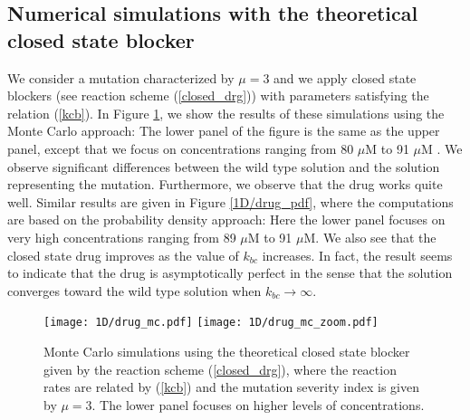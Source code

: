 \subsection{Numerical simulations with the theoretical closed state blocker}


We consider a mutation characterized by $\mu=3$ and we apply closed state blockers (see reaction scheme (\ref{closed_drg})) with
parameters  satisfying the relation
(\ref{kcb}). In Figure \ref{1D/drug_mc}, we show the results of these simulations using the Monte Carlo approach: The lower panel of the figure is the same as the upper panel, except that we focus on concentrations ranging from 80 $\mu$M  to 91 $\mu$M . We observe significant differences between the wild type solution and the solution representing the mutation. Furthermore, we observe that the drug works quite well.  Similar results are given in Figure \ref{1D/drug_pdf}, where the computations are based on the probability density approach: Here the lower panel focuses on very high concentrations ranging from 89 $\mu$M  to 91 $\mu$M. We also see that the closed state drug improves as the value of $k_{bc}$ increases. In fact, the result seems to indicate that the drug is asymptotically perfect in the sense that the solution converges toward the wild type solution when $k_{bc}\rightarrow \infty$.


\begin{figure}[p]\centering
\vbox{
\texttt{[image: 1D/drug\_mc.pdf]}
\texttt{[image: 1D/drug\_mc\_zoom.pdf]}
}
\caption{Monte Carlo simulations using the theoretical closed state blocker given by the reaction scheme (\ref{closed_drg}), where the reaction rates are related by (\ref{kcb}) and the mutation severity index is given by $\mu=3$. The lower panel focuses on higher levels of concentrations. \label{1D/drug_mc}}
\end{figure}


